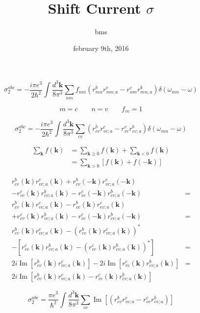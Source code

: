\documentclass{article}
\title{Shift Current $\sigma$}
\author{bms}
\date{february 9th, 2016}
\begin{document}
\maketitle

\begin{equation*}
\sigma^{abc}_2 = - \frac{i \pi e^{3}}{2 \hbar^{2}} \int \frac{d^{3}\mathbf{k}}{8\pi^{3}}
\sum_{nm}f_{nm}(r^{b}_{mn} r^{c}_{nm;a} - r^{c}_{nm} r^{b}_{mn;a})
\delta(\omega_{mn} - \omega)
\end{equation*}

\begin{equation*}
m = c \qquad
n = v \qquad
f_{vc} = 1
\end{equation*}

\begin{equation*}
\sigma^{abc}_2 = - \frac{i \pi e^{3}}{2 \hbar^{2}} \int \frac{d^{3}\mathbf{k}}{8\pi^{3}}
\sum_{cv}(r^{b}_{cv} r^{c}_{vc;a} - r^{c}_{vc} r^{b}_{cv;a})
\delta(\omega_{mn} - \omega)
\end{equation*}

\begin{align*}
\sum_{\mathbf{k}}f(\mathbf{k}) &= \sum_{\mathbf{k}\geq 0}f(\mathbf{k}) + 
\sum_{\mathbf{k}<0}f(\mathbf{k}) \\
&= \sum_{\mathbf{k}>0} \left[f(\mathbf{k}) + f(\mathbf{-k}) \right]
\end{align*}

\begin{align*}      
  r^{b}_{cv}(\mathbf{k}) r^{c}_{vc;a}(\mathbf{k}) + 
  r^{b}_{cv}(-\mathbf{k})r^{c}_{vc;a}(-\mathbf{k}) & \\
- r^{c}_{vc}(\mathbf{k}) r^{b}_{cv;a}(\mathbf{k}) - 
  r^{c}_{vc}(-\mathbf{k})r^{b}_{cv;a}(-\mathbf{k}) & = \\
  r^{b}_{cv}(\mathbf{k}) r^{c}_{vc;a}(\mathbf{k}) - 
  r^{b}_{vc}(\mathbf{k}) r^{c}_{cv;a}(\mathbf{k}) & \\
+ r^{c}_{cv}(\mathbf{k}) r^{b}_{vc;a}(\mathbf{k}) - 
  r^{c}_{vc}(-\mathbf{k})r^{b}_{cv;a}(-\mathbf{k}) & = \\
  r^{b}_{cv}(\mathbf{k}) r^{c}_{vc;a}(\mathbf{k}) -
  (r^{b}_{cv}(\mathbf{k}) r^{c}_{vc;a}(\mathbf{k}))^{*} \\
- [r^{c}_{vc}(\mathbf{k})r^{b}_{cv;a}(\mathbf{k})
- (r^{c}_{vc}(\mathbf{k})r^{b}_{cv;a}(\mathbf{k}))^{*}] & = \\
  2i \operatorname{Im} [r^{b}_{cv}(\mathbf{k}) r^{c}_{vc;a}(\mathbf{k})] - 
  2i \operatorname{Im} [r^{c}_{vc}(\mathbf{k}) r^{b}_{cv;a}(\mathbf{k})] & = \\
  2i \operatorname{Im} [r^{b}_{cv}(\mathbf{k}) r^{c}_{vc;a}(\mathbf{k}) - 
  r^{c}_{vc}(\mathbf{k}) r^{b}_{cv;a}(\mathbf{k})]
\end{align*}        

\begin{equation*}
\sigma^{abc}_2 = \frac{\pi e^{3}}{\hbar^{2}} \int \frac{d^{3}\mathbf{k}}{8\pi^{3}}
\sum_{vc}\operatorname{Im}[(r^{b}_{cv} r^{c}_{vc;a} - r^{c}_{vc} r^{b}_{cv;a})]
\end{equation*}
\end{document}
